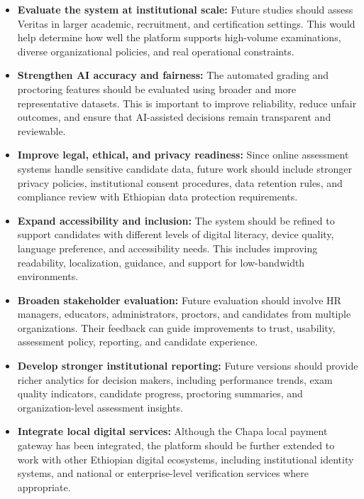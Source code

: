 \begin{itemize}
    \item \textbf{Evaluate the system at institutional scale:} Future studies should assess Veritas in larger academic, recruitment, and certification settings. This would help determine how well the platform supports high-volume examinations, diverse organizational policies, and real operational constraints.

    \item \textbf{Strengthen AI accuracy and fairness:} The automated grading and proctoring features should be evaluated using broader and more representative datasets. This is important to improve reliability, reduce unfair outcomes, and ensure that AI-assisted decisions remain transparent and reviewable.

    \item \textbf{Improve legal, ethical, and privacy readiness:} Since online assessment systems handle sensitive candidate data, future work should include stronger privacy policies, institutional consent procedures, data retention rules, and compliance review with Ethiopian data protection requirements.

    \item \textbf{Expand accessibility and inclusion:} The system should be refined to support candidates with different levels of digital literacy, device quality, language preference, and accessibility needs. This includes improving readability, localization, guidance, and support for low-bandwidth environments.

    \item \textbf{Broaden stakeholder evaluation:} Future evaluation should involve HR managers, educators, administrators, proctors, and candidates from multiple organizations. Their feedback can guide improvements to trust, usability, assessment policy, reporting, and candidate experience.

    \item \textbf{Develop stronger institutional reporting:} Future versions should provide richer analytics for decision makers, including performance trends, exam quality indicators, candidate progress, proctoring summaries, and organization-level assessment insights.

    \item \textbf{Integrate local digital services:} Although the Chapa local payment gateway has been integrated, the platform should be further extended to work with other Ethiopian digital ecosystems, including institutional identity systems, and national or enterprise-level verification services where appropriate.


\end{itemize}

